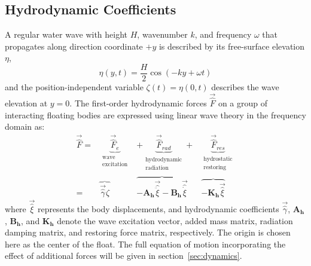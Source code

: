 \subsection{Hydrodynamic Coefficients}\label{sec:meem}
A regular water wave with height $H$, wavenumber $k$, and frequency $\omega$ that propagates along direction coordinate $+y$ is described by its free-surface elevation $\eta$,
\begin{equation}
    \eta(y,t)=\frac{H}{2}\cos(-ky+\omega t)
\end{equation}
and the position-independent variable $\zeta(t)=\eta(0,t)$ describes the wave elevation at $y=0$.
The first-order hydrodynamic forces $\vec{\hat{F}}$ on a group of interacting floating bodies are expressed using linear wave theory in the frequency domain as:
\setlength\arraycolsep{0pt}
\begin{equation}\label{eq:hydro-forces}
\begin{array}{rCCCCC}
     \vec{\hat{F}} = & \underbrace{\vec{\hat{F}}_{e}}_{\substack{\textrm{wave} \\  \textrm{excitation} }} & +\underbrace{\vec{\hat{F}}_{rad}}_{\substack{\text{hydrodynamic} \\ \text{radiation} }} +&  \underbrace{ \vec{\hat{F}}_{res}}_{\substack{\textrm{hydrostatic} \\ \text{restoring} }} \\
    = & \overbrace{\vec{\hat{\gamma}} \hat{\zeta}} & \overbrace{-\mathbf{A_h}\vec{\hat{\ddot{\xi}}} - \mathbf{B_h}\vec{\hat{\dot{\xi}}}} &  \overbrace{-\mathbf{K_h}\vec{\hat{\xi}}}
\end{array}
\end{equation}
where $\vec{\hat{\xi}}$ represents the body displacements, and hydrodynamic coefficients $\vec{\hat{\gamma}}$, $\mathbf{A_h}$, $\mathbf{B_h}$, and $\mathbf{K_h}$ denote the wave excitation vector, added mass matrix, radiation damping matrix, and restoring force matrix, respectively.
The origin is chosen here as the center of the float.
The full equation of motion incorporating the effect of additional forces will be given in section~\ref{sec:dynamics}.

